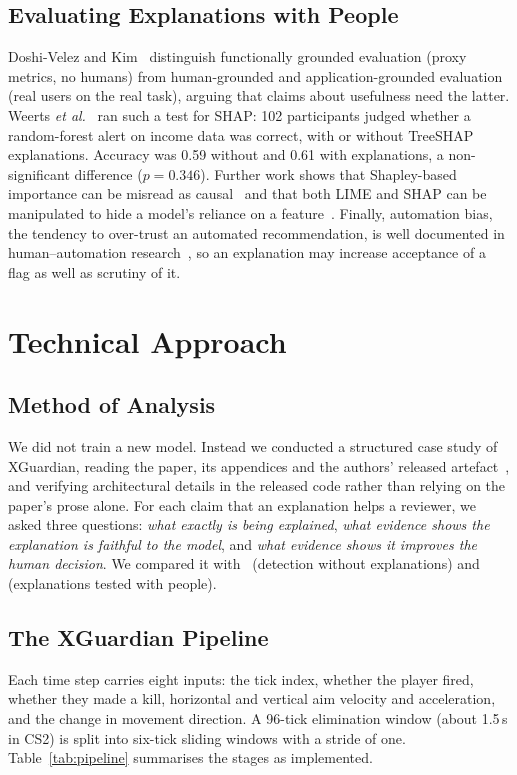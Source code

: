 \documentclass[conference]{IEEEtran}
\begin{document}
\subsection{Evaluating Explanations with People}
Doshi-Velez and Kim~\cite{doshivelez2017rigorous} distinguish functionally grounded evaluation (proxy metrics, no humans) from human-grounded and application-grounded evaluation (real users on the real task), arguing that claims about usefulness need the latter. Weerts \textit{et al.}~\cite{weerts2019human} ran such a test for SHAP: 102 participants judged whether a random-forest alert on income data was correct, with or without TreeSHAP explanations. Accuracy was 0.59 without and 0.61 with explanations, a non-significant difference ($p=0.346$). Further work shows that Shapley-based importance can be misread as causal~\cite{kumar2020problems} and that both LIME and SHAP can be manipulated to hide a model's reliance on a feature~\cite{slack2020fooling}. Finally, automation bias, the tendency to over-trust an automated recommendation, is well documented in human--automation research~\cite{parasuraman2010complacency}, so an explanation may increase acceptance of a flag as well as scrutiny of it.

\section{Technical Approach}

\subsection{Method of Analysis}
We did not train a new model. Instead we conducted a structured case study of XGuardian, reading the paper, its appendices and the authors' released artefact~\cite{zhang2026artifact}, and verifying architectural details in the released code rather than relying on the paper's prose alone. For each claim that an explanation helps a reviewer, we asked three questions: \emph{what exactly is being explained}, \emph{what evidence shows the explanation is faithful to the model}, and \emph{what evidence shows it improves the human decision}. We compared it with~\cite{sousa2025minecraft} (detection without explanations) and~\cite{weerts2019human} (explanations tested with people).

\subsection{The XGuardian Pipeline}
Each time step carries eight inputs: the tick index, whether the player fired, whether they made a kill, horizontal and vertical aim velocity and acceleration, and the change in movement direction. A 96-tick elimination window (about 1.5\,s in CS2) is split into six-tick sliding windows with a stride of one. Table~\ref{tab:pipeline} summarises the stages as implemented.
\end{document}

